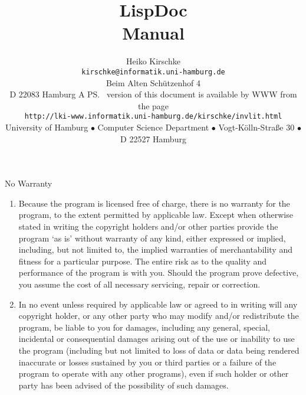 %
\title{LispDoc\\
Manual\\[\bigskipamount]}
%
\author{%
Heiko Kirschke\\
{\normalsize\tt kirschke@informatik.uni-hamburg.de}\\
Beim Alten Sch\"{u}tzenhof 4\\
D 22083 Hamburg
%
\vfill%
{\small A \ps\ version of this document is available by WWW from the
page\\
\texttt{http://lki-www.informatik.uni-hamburg.de/\td{}kirschke/invlit.html}\\[2cm]
University of Hamburg $\bullet$
Computer Science Department $\bullet$
Vogt-K\"{o}lln-Stra\ss{}e 30 $\bullet$
D 22527 Hamburg}}
%
\maketitle
%
\clearpage\thispagestyle{empty}
%
\begin{center}
			No Warranty
\end{center}
%
\begin{enumerate}
%
\item Because the program is licensed free of charge, there is no
warranty for the program, to the extent permitted by applicable law.
Except when otherwise stated in writing the copyright holders and/or
other parties
provide the program `as is' without warranty of any kind, either
expressed or implied, including, but not limited to, the implied
warranties of merchantability and fitness for a particular purpose.  The
entire risk as to the quality and performance of the program is with
you. Should the program prove defective, you assume the cost of all
necessary servicing, repair or correction.
%
\item In no event unless required by applicable law or agreed to in
writing will any copyright holder, or any other party who may modify
and/or redistribute the
 program, be
liable to you for
damages, including any general, special, incidental or consequential
damages arising out of the use or inability to use the program
(including but not limited to loss of data or data being rendered
inaccurate or losses sustained by you or third parties or a failure of
the program to operate with any other programs), even if such holder or
other party has been advised of the possibility of such damages.
%
\end{enumerate}%
%
